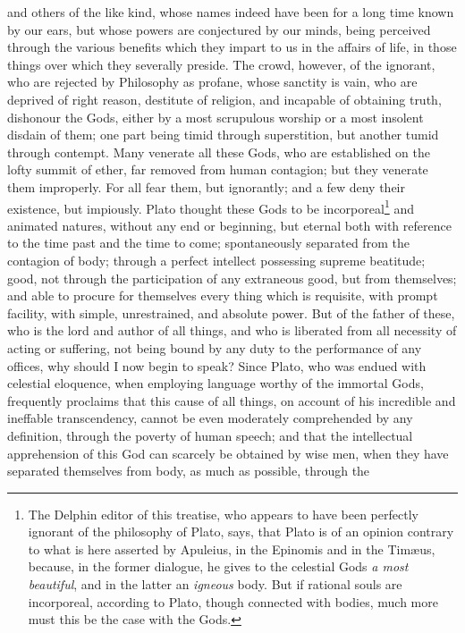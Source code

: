 \documentclass{article}
\begin{document}
\noindent and others of the like kind, whose names indeed have been for a long
time known by our ears, but whose powers are conjectured by our minds, being
perceived through the various benefits which they impart to us in the affairs
of life, in those things over which they severally preside. The crowd, however,
of the ignorant, who are rejected by Philosophy as profane, whose sanctity is
vain, who are deprived of right reason, destitute of religion, and incapable of
obtaining truth, dishonour the Gods, either by a most scrupulous worship or a
most insolent disdain of them; one part being timid through superstition, but
another tumid through contempt. Many venerate all these Gods, who are
established on the lofty summit of ether, far removed from human contagion; but
they venerate them improperly. For all fear them, but ignorantly; and a few
deny their existence, but impiously. Plato thought these Gods to be
incorporeal\footnote{The Delphin editor of this treatise, who appears to have
been perfectly ignorant of the philosophy of Plato, says, that Plato is of an
opinion contrary to what is here asserted by Apuleius, in the Epinomis
and in the Tim{\ae}us, because, in the former dialogue, he gives to
the celestial Gods \textit{a most beautiful}, and in the latter an
\textit{igneous} body. But if rational souls are incorporeal, according to
Plato, though connected with bodies, much more must this be the case with the
Gods.} and animated natures, without any end or beginning, but eternal both
with reference to the time past and the time to come; spontaneously separated
from the contagion of body; through a perfect intellect possessing supreme
beatitude; good, not through the participation of any extraneous good, but from
themselves; and able to procure for themselves every thing which is requisite,
with prompt facility, with simple, unrestrained, and absolute power. But of the
father of these, who is the lord and author of all things, and who is liberated
from all necessity of acting or suffering, not being bound by any duty to the
performance of any offices, why should I now begin to speak? Since Plato, who
was endued with celestial eloquence, when employing language worthy of the
immortal Gods, frequently proclaims that this cause of all things, on account
of his incredible and ineffable transcendency, cannot be even moderately
comprehended by any definition, through the poverty of human speech; and that
the intellectual apprehension of this God can scarcely be obtained by wise men,
when they have separated themselves from body, as much as possible, through the
\end{document}
